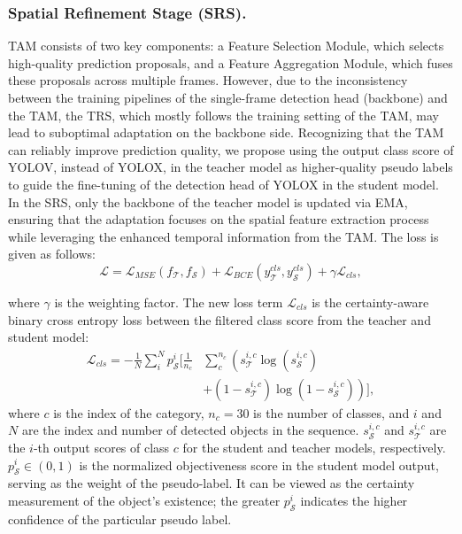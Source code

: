 \subsubsection{Spatial Refinement Stage (SRS).} 
TAM consists of two key components: a Feature Selection Module, which selects high-quality prediction proposals, and a Feature Aggregation Module, which fuses these proposals across multiple frames. However, due to the inconsistency between the training pipelines of the single-frame detection head (backbone) and the TAM, the TRS, which mostly follows the training setting of the TAM, may lead to suboptimal adaptation on the backbone side. Recognizing that the TAM can reliably improve prediction quality, we propose using the output class score of YOLOV, instead of YOLOX, in the teacher model as higher-quality pseudo labels to guide the fine-tuning of the detection head of YOLOX in the student model. In the SRS, only the backbone of the teacher model is updated via EMA, ensuring that the adaptation focuses on the spatial feature extraction process while leveraging the enhanced temporal information from the TAM. The loss is given as follows:
\begin{equation}
    \mathcal{L} = \mathcal{L}_{MSE}(f_{\mathcal{T}}, f_{\mathcal{S}}) + \mathcal{L}_{BCE}(y_{\mathcal{T}}^{cls}, y_{\mathcal{S}}^{cls}) + \gamma \mathcal{L}_{cls},
\end{equation}

\noindent where $\gamma$ is the weighting factor. The new loss term $\mathcal{L}_{cls}$ is the certainty-aware binary cross entropy loss between the filtered class score from the teacher and student model:
\begin{equation}
\begin{aligned}
    \mathcal{L}_{cls}  = -\frac{1}{N}\sum_{i}^{N} p^{i}_{\mathcal{S}} \Big[ \frac{1}{n_{c}} & \sum_{c}^{n_c}  \left( s_{\mathcal{T}}^{i,c} \log(s_{\mathcal{S}}^{i,c}) \right. \\
    & \left.  +(1-s_{\mathcal{T}}^{i,c}) \log(1-s_{\mathcal{S}}^{i,c}) \right) \Big],
\end{aligned}
\end{equation}
\noindent where $c$ is the index of the category, $n_c=30$ is the number of classes, and $i$ and $N$ are the index and number of detected objects in the sequence. $s_{\mathcal{S}}^{i,c}$ and $s_{\mathcal{T}}^{i,c}$ are the $i$-th output scores of class $c$ for the student and teacher models, respectively. $p^{i}_{\mathcal{S}} \in (0,1)$ is the normalized objectiveness score in the student model output, serving as the weight of the pseudo-label. It can be viewed as the certainty measurement of the object's existence; the greater $p^{i}_{\mathcal{S}}$ indicates the higher confidence of the particular pseudo label.
 
